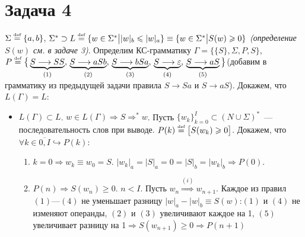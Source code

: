 \documentclass[a4paper]{article}
\def\eqdef{\overset{\mbox{\tiny def}}{=}}
\begin{document}
{\begin{itemize}
\begin{enumerate}
\begin{enumerate}[1.]
\end{enumerate}
\end{enumerate}
\end{itemize}
\section*{Задача 4}
$\Sigma\eqdef\{a,b\}$, $\Sigma^*\supset L\eqdef\{w\in\Sigma^*\big||w|_b\leqslant|w|_a\}\equiv\{w\in\Sigma^*\big|S(w)\geqslant 0\}$ {\em (определение $S(w)$ см. в задаче 3)}.\newline
Определим КС-грамматику $\Gamma=\{\{S\},\Sigma,P,S\}$,\newline
$P\eqdef\big\{\underbrace{S\longrightarrow SS}_{(1)},\,\underbrace{S\longrightarrow aSb}_{(2)},\,\underbrace{S\longrightarrow bSa}_{(3)},\,\underbrace{S\longrightarrow \varepsilon}_{(4)},\,\underbrace{S\longrightarrow aS}_{(5)}\big\}$\newline (добавим в грамматику из предыдущей задачи правила $S\longrightarrow Sa$ и $S\longrightarrow aS$).\newline
Докажем, что $L(\Gamma)=L$:\begin{itemize}
\item $L(\Gamma)\subset L$. $w\in L(\Gamma)\Rightarrow S\Longrightarrow^* w$. Пусть $\{w_k\}_{k=0}^I\subset (N\cup \Sigma)^*$~--- последовательность слов при выводе.\newline
$P(k)\eqdef\big[S(w_k)\geqslant 0\big]$. Докажем, что $\forall k\in\overline{0,I}\hookrightarrow P(k)$:\begin{enumerate}[1.]
\item $k=0\Rightarrow w_k\equiv w_0=S$. $|w_k|_a=|S|_a=0=|S|_b=|w_k|_b\Rightarrow P(0)$.
\item $P(n)\Rightarrow S(w_n)\geqslant 0$. $n<I$. Пусть $w_n\overset{(i)}{\Longrightarrow}w_{n+1}$. Каждое из правил $(1)$---$(4)$ не уменьшает разницу $|w|_a-|w|_b\equiv S(w)$:\newline$(1)$ и $(4)$ не изменяют операнды, $(2)$ и $(3)$ увеличивают каждое на 1, $(5)$ увеличивает разницу на 1$\Rightarrow S(w_{n+1})\geqslant 0\Rightarrow P(n+1)$

\end{enumerate}
\end{itemize}}
\end{document}
